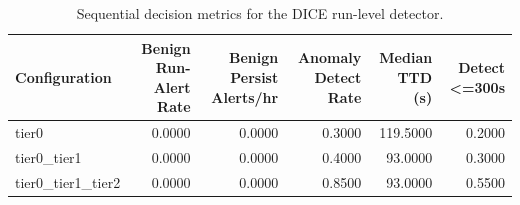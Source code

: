 \begin{table}[t]
\centering
\caption{Sequential decision metrics for the DICE run-level detector.}
\label{tab:dice_sequential_metrics}
\footnotesize
\begin{tabular}{lrrrrr}
\toprule
Configuration & Benign Run-Alert Rate & Benign Persist Alerts/hr & Anomaly Detect Rate & Median TTD (s) & Detect <=300s \\
\midrule
tier0 & 0.0000 & 0.0000 & 0.3000 & 119.5000 & 0.2000 \\
tier0_tier1 & 0.0000 & 0.0000 & 0.4000 & 93.0000 & 0.3000 \\
tier0_tier1_tier2 & 0.0000 & 0.0000 & 0.8500 & 93.0000 & 0.5500 \\
\bottomrule
\end{tabular}

\end{table}
